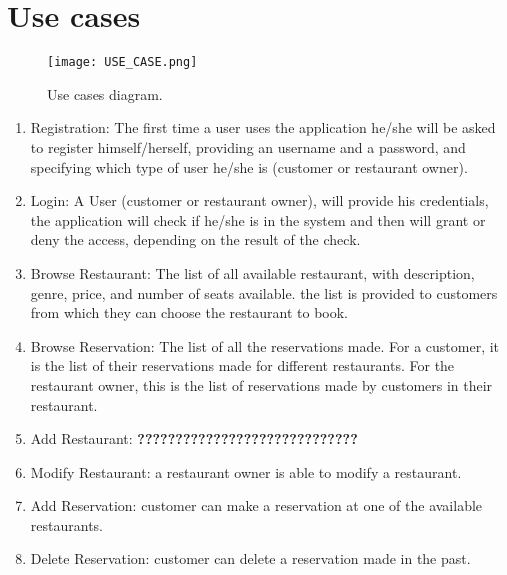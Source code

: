 \section{Use cases}

\begin{figure}
  \texttt{[image: USE\_CASE.png]}
  \caption{Use cases diagram.}
  \label{figureUSE_CASE}
\end{figure}

	\begin{enumerate}
		\item Registration: The first time a user uses the application  he/she will be asked to register himself/herself, providing an username and a password, and specifying which type of user he/she is (customer or restaurant owner).
		\item Login: A User (customer or restaurant owner), will provide his credentials, the application will check if he/she is in the system and then will grant or deny the access, depending on the result of the check.
		\item Browse Restaurant: The list of all available restaurant, with description, genre, price, and number of seats available. the list is provided to  customers from which they can choose the restaurant to book.
		\item Browse Reservation: The list of all the reservations made. For a customer, it is the list of their reservations made for different restaurants. For the restaurant owner, this is the list of reservations made by customers in their restaurant.
		\item Add Restaurant: \textbf{?????????????????????????????}
		\item Modify Restaurant: a restaurant owner is able to modify a restaurant.
		\item Add Reservation: customer can make a reservation at one of the available restaurants.
		\item Delete Reservation: customer can delete a reservation made in the past.
	\end{enumerate}

\pagebreak